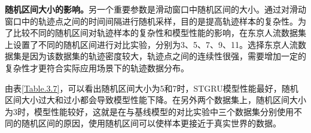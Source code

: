 \documentclass[master]{thesis-uestc}
\begin{document}
\textbf{随机区间大小的影响。}另一个重要参数是滑动窗口中随机区间的大小。通过对滑动窗口中的轨迹点之间的时间间隔进行随机采样，目的是提高轨迹样本的复杂性。为了比较不同的随机区间对轨迹样本的复杂性和模型性能的影响，在东京人流数据集上设置了不同的随机区间进行对比实验，分别为3、5、7、9、11。选择东京人流数据集是因为该数据集的轨迹密度较大，轨迹点之间的连续性很强，需要增加一定的复杂性才更符合实际应用场景下的轨迹数据分布。
\begin{table}[ht]
\centering
\caption{不同随机时间间隔对模型性能的影响}
\label{Table.3.7}
\end{table}

由表\ref{Table.3.7}，可以看出随机区间大小为5和7时，STGRU模型性能最好，随机区间大小过大和过小都会导致模型性能下降。在另外两个数据集上，随机区间大小为3时，模型性能较好，这就是在与基线模型的对比实验中三个数据集分别使用不同的随机区间的原因，使用随机区间可以使样本更接近于真实世界的数据。
\end{document}
